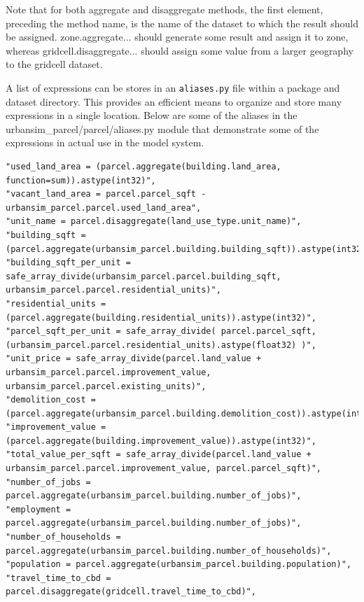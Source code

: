 
Note that for both aggregate and disaggregate methods, the first element, preceding the method name, is the name of the dataset to which the result should be assigned.  zone.aggregate... should generate some result and assign it to zone, whereas gridcell.disaggregate... should assign some value from a larger geography to the gridcell dataset.

A list of expressions can be stores in an \verb#aliases.py# file within a package and dataset directory.  This provides an efficient means to organize and store many expressions in a single location.  Below are some of the aliases in the urbansim\_parcel/parcel/aliases.py module that demonstrate some of the expressions in actual use in the model system.\\

\begin{lstlisting}
"used_land_area = (parcel.aggregate(building.land_area, function=sum)).astype(int32)",
"vacant_land_area = parcel.parcel_sqft - urbansim_parcel.parcel.used_land_area",
"unit_name = parcel.disaggregate(land_use_type.unit_name)",
"building_sqft = (parcel.aggregate(urbansim_parcel.building.building_sqft)).astype(int32)",
"building_sqft_per_unit = safe_array_divide(urbansim_parcel.parcel.building_sqft, urbansim_parcel.parcel.residential_units)",
"residential_units = (parcel.aggregate(building.residential_units)).astype(int32)",       
"parcel_sqft_per_unit = safe_array_divide( parcel.parcel_sqft, (urbansim_parcel.parcel.residential_units).astype(float32) )",
"unit_price = safe_array_divide(parcel.land_value + urbansim_parcel.parcel.improvement_value, urbansim_parcel.parcel.existing_units)",
"demolition_cost = (parcel.aggregate(urbansim_parcel.building.demolition_cost)).astype(int32)",
"improvement_value = (parcel.aggregate(building.improvement_value)).astype(int32)",
"total_value_per_sqft = safe_array_divide(parcel.land_value + urbansim_parcel.parcel.improvement_value, parcel.parcel_sqft)",
"number_of_jobs = parcel.aggregate(urbansim_parcel.building.number_of_jobs)",
"employment = parcel.aggregate(urbansim_parcel.building.number_of_jobs)",
"number_of_households = parcel.aggregate(urbansim_parcel.building.number_of_households)",
"population = parcel.aggregate(urbansim_parcel.building.population)",
"travel_time_to_cbd = parcel.disaggregate(gridcell.travel_time_to_cbd)",       
\end{lstlisting}

